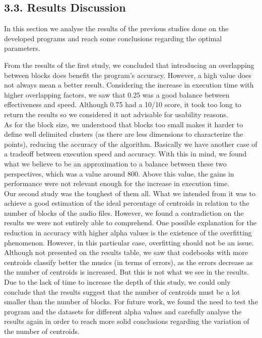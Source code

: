 \documentclass[12pt]{article}
\begin{document}
\subsection*{3.3. Results Discussion}

In this section we analyse the results of the previous studies done on the 
developed programs and reach some conclusions regarding the optimal parameters.

From the results of the first study, we concluded that introducing an overlapping 
between blocks does benefit the program's accuracy.
However, a high value does not always mean a better result.
Considering the increase in execution time with higher overlapping factors, we 
saw that 0.25 was a good balance between effectiveness and speed.
Although 0.75 had a 10/10 score, it took too long to return the results so we 
considered it not advisable for usability reasons.\\

As for the block size, we understood that blocks too small makes it harder to 
define well delimited clusters (as there are less dimensions to characterize the
points), reducing the accuracy of the algorithm.
Basically we have another case of a tradeoff between execution speed and accuracy.
With this in mind, we found what we believe to be an approximation to a balance
between these two perspectives, which was a value around 800. 
Above this value, the gains in performance were not relevant enough for the 
increase in execution time. \\

Our second study was the toughest of them all.
What we intended from it was to achieve a good estimation of the ideal percentage
of centroids in relation to the number of blocks of the audio files.
However, we found a contradiction on the results we were not entirely able to 
comprehend.
One possible explanation for the reduction in accuracy with higher alpha values
is the existence of the overfitting phenomenon. 
However, in this particular case, overfitting should not be an issue.
Although not presented on the results table, we saw that codebooks with more
centroids classify better the musics (in terms of errors), as the errors decrease
as the number of centroids is increased.
But this is not what we see in the results.
Due to the lack of time to increase the depth of this study, we could only 
conclude that the results suggest that the number of centroids must be a lot 
smaller than the number of blocks. 
For future work, we found the need to test the program and the datasets for 
different alpha values and carefully analyse the results again in order to 
reach more solid conclusions regarding the variation of the number of centroids. \\
\end{document}

